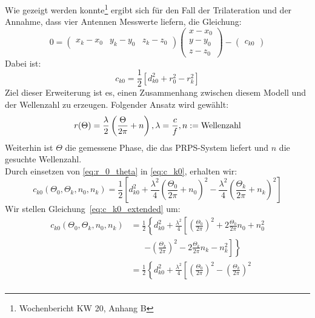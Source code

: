 {
%
Wie gezeigt werden konnte\footnote{Wochenbericht KW 20, Anhang B} ergibt sich für den Fall der Trilateration und der Annahme, dass vier Antennen Messwerte liefern, die Gleichung:
\begin{equation}\label{eq:final_trilateration_model}
0=
\left(
	\begin{array}{ccc}
		x_k-x_0 & y_k-y_0 & z_k-z_0 
	\end{array}
\right)
\left(
   \begin{array}{c}
	   x-x_0\\
	   y-y_0\\
	   z-z_0
   \end{array}
\right)
-
\left(
	\begin{array}{c}
		c_{k0}
	\end{array}
\right) 
\end{equation}
%
Dabei ist:
\begin{equation}\label{eq:c_k0}
	c_{k0}=\frac{1}{2}[d_{k0}^2+r_{0}^2-r_k^2]
\end{equation}
%
Ziel dieser Erweiterung ist es, einen Zusammenhang zwischen diesem Modell und der Wellenzahl zu erzeugen. Folgender Ansatz wird gewählt:
	\begin{equation}\label{eq:r_0_theta} r(\Theta)=\frac{\lambda}{2}\left(\frac{\Theta}{2\pi}+n\right),\\\lambda=\frac{c}{f}, n:= \text{Wellenzahl}
\end{equation}
%
%
Weiterhin ist $\Theta$ die gemessene Phase, die das PRPS-System liefert und $n$ die gesuchte Wellenzahl.\\
Durch einsetzen von \eqref{eq:r_0_theta} in \eqref{eq:c_k0}, erhalten wir:
\begin{equation}\label{eq:c_k0_extended}
	c_{k0}(\Theta_0, \Theta_k, n_0, n_k) =\frac{1}{2}\left[d_{k0}^2+\frac{\lambda^2}{4}\left(\frac{\Theta_0}{2\pi}+n_0\right)^2-\frac{\lambda^2}{4}\left(\frac{\Theta_k}{2\pi}+n_k\right)^2\right]
\end{equation}
%
Wir stellen Gleichung~\eqref{eq:c_k0_extended} um:
\begin{align}
%	
	c_{k0}(\Theta_0, \Theta_k, n_0, n_k) &= \frac{1}{2}\left\{d_{k0}^2+\frac{\lambda^2}{4}\left[\left(\frac{\Theta_0}{2\pi}\right)^2+2\frac{\Theta_0}{2\pi}n_0+n_0^2 \right.\right.\nonumber\\
	&\phantom{=}\; 
	\left.\left.-\left(\frac{\Theta_k}{2\pi}\right)^2-2\frac{\Theta_k}{2\pi}n_k-n_k^2\right]\right\}\\
%    
    &=\frac{1}{2}\left\{d_{k0}^2+\frac{\lambda^2}{4}\left[\left(\frac{\Theta_0}{2\pi}\right)^2-\left(\frac{\Theta_k}{2\pi}\right)^2 \right.\right.\nonumber\\

\end{align}}
